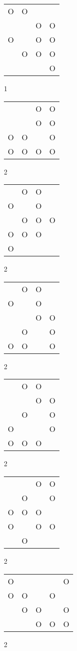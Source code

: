\begin{tabular}{|m{0.2cm}m{0.2cm}m{0.2cm}m{0.2cm}|}\hline
O&O& & \\
 & &O&O\\
O& &O&O\\
 &O&O&O\\
 & & &O\\
\hline\end{tabular}1
\begin{tabular}{|m{0.2cm}m{0.2cm}m{0.2cm}m{0.2cm}|}\hline
 & &O&O\\
 & &O&O\\
O&O& &O\\
O&O&O&O\\
\hline\end{tabular}2
\begin{tabular}{|m{0.2cm}m{0.2cm}m{0.2cm}m{0.2cm}|}\hline
 &O&O& \\
O& &O& \\
 &O&O&O\\
O&O&O& \\
O& & & \\
\hline\end{tabular}2
\begin{tabular}{|m{0.2cm}m{0.2cm}m{0.2cm}m{0.2cm}|}\hline
 &O&O& \\
O& &O& \\
 & &O&O\\
 &O& &O\\
O&O& &O\\
\hline\end{tabular}2
\begin{tabular}{|m{0.2cm}m{0.2cm}m{0.2cm}m{0.2cm}|}\hline
 &O&O& \\
 & &O&O\\
 &O& &O\\
O& & &O\\
O&O&O& \\
\hline\end{tabular}2
\begin{tabular}{|m{0.2cm}m{0.2cm}m{0.2cm}m{0.2cm}|}\hline
 & &O&O\\
 &O& &O\\
O&O&O& \\
O& &O&O\\
 &O& & \\
\hline\end{tabular}2
\begin{tabular}{|m{0.2cm}m{0.2cm}m{0.2cm}m{0.2cm}m{0.2cm}|}\hline
O& & & &O\\
O&O& &O& \\
 &O&O& &O\\
 & &O&O&O\\
\hline\end{tabular}2
